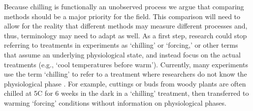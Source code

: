 \documentclass[11pt]{article}
\begin{document}
Because chilling is functionally an unobserved process we argue that comparing methods should be a major priority for the field. This comparison will need to allow for the reality that different methods may measure different processes and, thus, terminology may need to adapt as well. As a first step, research could stop referring to treatments in experiments as `chilling' or `forcing,' or other terms that assume an underlying physiological state, and instead focus on the actual treatments (e.g., `cool temperatures before warm'). Currently, many experiments use the term `chilling' to refer to a treatment where researchers do not know the physiological phase \citep{flynn2018,ospreebbms}. For example, cuttings or buds from woody plants are often chilled at 5\degree C for 6 weeks in the dark in a `chilling' treatment, then transferred to warming `forcing' conditions without information on physiological phases. %
\end{document}
